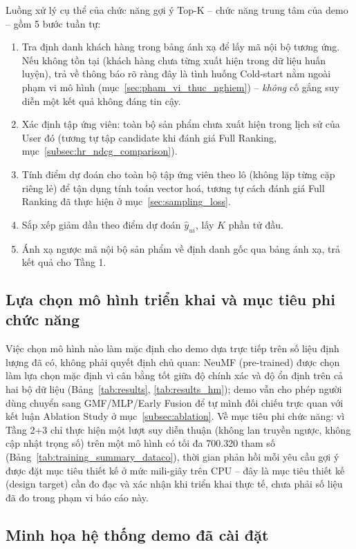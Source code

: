 Luồng xử lý cụ thể của chức năng gợi ý Top-K -- chức năng trung tâm của demo -- gồm 5 bước tuần tự:
\begin{enumerate}
    \item Tra định danh khách hàng trong bảng ánh xạ để lấy mã nội bộ tương ứng. Nếu không tồn tại (khách hàng chưa từng xuất hiện trong dữ liệu huấn luyện), trả về thông báo rõ ràng đây là tình huống Cold-start nằm ngoài phạm vi mô hình (mục~\ref{sec:pham_vi_thuc_nghiem}) -- \emph{không} cố gắng suy diễn một kết quả không đáng tin cậy.
    \item Xác định tập ứng viên: toàn bộ sản phẩm chưa xuất hiện trong lịch sử của User đó (tương tự tập candidate khi đánh giá Full Ranking, mục~\ref{subsec:hr_ndcg_comparison}).
    \item Tính điểm dự đoán cho toàn bộ tập ứng viên theo lô (không lặp từng cặp riêng lẻ) để tận dụng tính toán vector hoá, tương tự cách đánh giá Full Ranking đã thực hiện ở mục~\ref{sec:sampling_loss}.
    \item Sắp xếp giảm dần theo điểm dự đoán $\hat{y}_{ui}$, lấy $K$ phần tử đầu.
    \item Ánh xạ ngược mã nội bộ sản phẩm về định danh gốc qua bảng ánh xạ, trả kết quả cho Tầng 1.
\end{enumerate}

\subsection{Lựa chọn mô hình triển khai và mục tiêu phi chức năng}
\label{subsec:demo_model_choice}

Việc chọn mô hình nào làm mặc định cho demo dựa trực tiếp trên số liệu định lượng đã có, không phải quyết định chủ quan: NeuMF (pre-trained) được chọn làm lựa chọn mặc định vì cân bằng tốt giữa độ chính xác và độ ổn định trên cả hai bộ dữ liệu (Bảng~\ref{tab:results}, \ref{tab:results_hm}); demo vẫn cho phép người dùng chuyển sang GMF/MLP/Early Fusion để tự mình đối chiếu trực quan với kết luận Ablation Study ở mục~\ref{subsec:ablation}. Về mục tiêu phi chức năng: vì Tầng 2+3 chỉ thực hiện một lượt suy diễn thuận (không lan truyền ngược, không cập nhật trọng số) trên một mô hình có tối đa 700.320 tham số (Bảng~\ref{tab:training_summary_dataco}), thời gian phản hồi mỗi yêu cầu gợi ý được đặt mục tiêu thiết kế ở mức mili-giây trên CPU -- đây là mục tiêu thiết kế (design target) cần đo đạc và xác nhận khi triển khai thực tế, chưa phải số liệu đã đo trong phạm vi báo cáo này.

\subsection{Minh họa hệ thống demo đã cài đặt}
\label{subsec:demo_screenshots}

